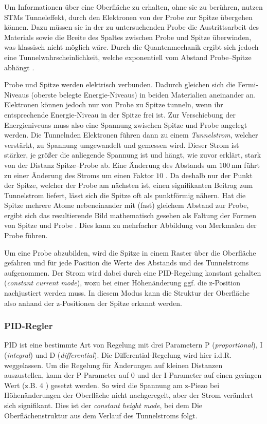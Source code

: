 \documentclass{article}
\newcommand{\defc}{black}
\newcommand{\colorT}[2][blue]{\color{#1}{#2}\color{\defc}}
\newcommand{\todo}[1]{\colorT[red]{\textbf{(#1)}}}
\begin{document}
Um Informationen über eine Oberfläche zu erhalten, ohne sie zu berühren, nutzen STMs
Tunneleffekt, durch den Elektronen von der Probe zur Spitze übergehen können.
Dazu müssen sie in der zu untersuchenden Probe die Austrittsarbeit des Materials 
sowie  die Breite des Spaltes zwischen Probe und Spitze überwinden,
was klassisch nicht möglich wäre. Durch die Quantenmechanik ergibt sich jedoch eine
Tunnelwahrscheinlichkeit, welche exponentiell vom Abstand Probe--Spitze abhängt \todo{Quelle}.

Probe und Spitze werden elektrisch verbunden. Dadurch gleichen sich die Fermi-Niveaus (oberste belegte Energie-Niveaus) in beiden Materialien aneinander an.
Elektronen können jedoch nur von Probe zu Spitze tunneln, wenn ihr entsprechende Energie-Niveau
in der Spitze frei ist. Zur Verschiebung der Energieniveuas muss also eine Spannung zwischen Spitze und Probe angelegt werden.
Die Tunnelnden Elektronen führen dann zu einem \textit{Tunnelstrom}, welcher verstärkt,
zu Spannung umgewandelt und gemessen wird. Dieser Strom ist stärker, je größer die
anliegende Spannung ist und hängt,
wie zuvor erklärt, stark von der Distanz Spitze--Probe ab. Eine Änderung des Abstands
um $\SI{100}{\nm}$ führt zu einer Änderung des Stroms um einen Faktor $10$ \cite{wiki-stm} \todo{Quelle oder rausnehmen}.
Da deshalb nur der Punkt der Spitze, welcher der Probe am nächsten ist, einen signifikanten Beitrag zum Tunnelstrom liefert, lässt sich die Spitze oft als punktförmig nähern.
Hat die Spitze mehrere Atome nebeneinander mit (fast) gleichem Abstand zur Probe,
ergibt sich das resultierende Bild mathematisch gesehen als Faltung der Formen
von Spitze und Probe \cite{Anleitung}. Dies kann zu mehrfacher Abbildung von 
Merkmalen der Probe führen.

Um eine Probe abzubilden, wird die Spitze in einem Raster über die Oberfläche 
gefahren und für jede Position die Werte des Abstands und des Tunnelstroms aufgenommen.
Der Strom wird dabei durch eine PID-Regelung konstant gehalten (\textit{constant current mode}), wozu bei einer Höhenänderung ggf. die z-Position nachjustiert werden muss. In diesem Modus kann die Struktur der Oberfläche also anhand der z-Positionen
der Spitze erkannt werden.

\subsubsection*{PID-Regler}
PID ist eine bestimmte Art von Regelung mit drei Parametern P (\textit{proportional}), I (\textit{integral}) und D (\textit{differential}).
Die Differential-Regelung wird hier i.d.R. weggelassen. Um die Regelung für Änderungen auf kleinen Distanzen auszustellen, kann der P-Parameter auf $0$ und
der I-Parameter auf einen geringen Wert (z.B. $4$ \cite{Anleitung}) gesetzt werden.
So wird die Spannung am z-Piezo bei Höhenänderungen der Oberfläche nicht nachgeregelt,
aber der Strom verändert sich signifikant. Dies ist der \textit{constant height mode},
bei dem Die Oberflächenstruktur aus dem Verlauf des Tunnelstroms folgt.\\
\end{document}

